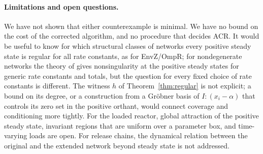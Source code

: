 \documentclass[11pt,a4paper]{article}
\theoremstyle{plain}
\theoremstyle{definition}
\theoremstyle{remark}
\begin{document}
\paragraph{Limitations and open questions.}
We have not shown that either counterexample is minimal. We have no bound on the cost of the corrected algorithm, and no procedure that decides ACR. It would be useful to know for which structural classes of networks every positive steady state is regular for all rate constants, as for EnvZ/OmpR; for nondegenerate networks the theory of \cite{generic} gives nonsingularity at the positive steady states for generic rate constants and totals, but the question for every fixed choice of rate constants is different. The witness $h$ of Theorem~\ref{thm:regular} is not explicit; a bound on its degree, or a construction from a Gr\"obner basis of $I:(x_i-\alpha)$ that controls its zero set in the positive orthant, would connect coverage and conditioning more tightly. For the loaded reactor, global attraction of the positive steady state, invariant regions that are uniform over a parameter box, and time-varying loads are open. For release chains, the dynamical relation between the original and the extended network beyond steady state is not addressed.



\end{document}
